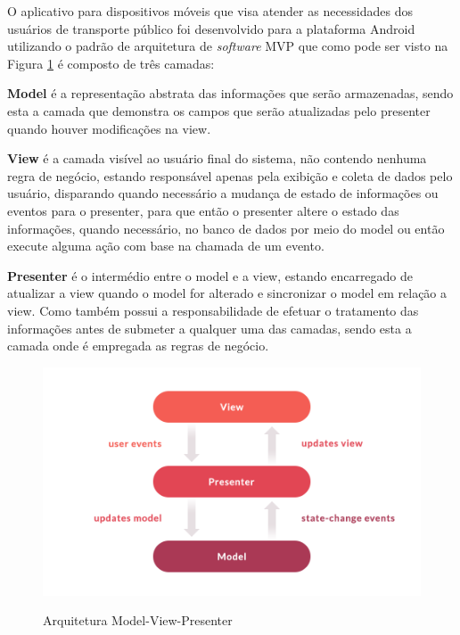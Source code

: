 {{{{O aplicativo para dispositivos móveis que visa atender as necessidades dos usuários de transporte público foi desenvolvido para a plataforma Android utilizando o padrão de arquitetura de \textit{software} MVP que como pode ser visto na Figura \ref{fig:model-view-presenter} é composto de três camadas:

\begin{lista}
\item \textbf{Model} é a representação abstrata das informações que serão armazenadas, sendo esta a camada que demonstra os campos que serão atualizadas pelo presenter quando houver modificações na view.
\item \textbf{View} é a camada visível ao usuário final do sistema, não contendo nenhuma regra de negócio, estando responsável apenas pela exibição e coleta de dados pelo usuário, disparando quando necessário a mudança de estado de informações ou eventos para o presenter, para que então o presenter altere o estado das informações, quando necessário, no banco de dados por meio do model ou então execute alguma ação com base na chamada de um evento.
\item \textbf{Presenter} é o intermédio entre o model e a view, estando encarregado de atualizar a view quando o model for alterado e sincronizar o model em relação a view. Como também possui a responsabilidade de efetuar o tratamento das informações antes de submeter a qualquer uma das camadas, sendo esta a camada onde é empregada as regras de negócio.
\end{lista}

\begin{figure}[H]
\caption{Arquitetura Model-View-Presenter}
\centering
\includegraphics[width=1.0\textwidth]{imagens/model-view-presenter.png}
\label{fig:model-view-presenter}
\end{figure}

}}}}
